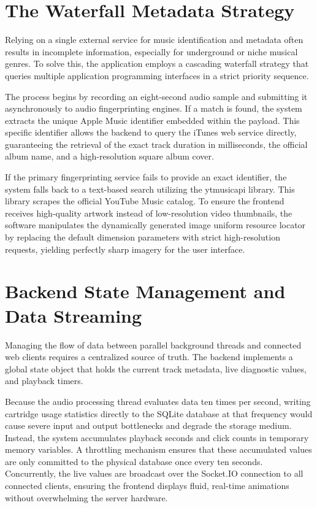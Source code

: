 \documentclass[12pt,a4paper,english]{report}
\begin{document}
\section{The Waterfall Metadata Strategy}

Relying on a single external service for music identification and metadata often results in incomplete information, especially for underground or niche musical genres. To solve this, the application employs a cascading waterfall strategy that queries multiple application programming interfaces in a strict priority sequence.

The process begins by recording an eight-second audio sample and submitting it asynchronously to audio fingerprinting engines. If a match is found, the system extracts the unique Apple Music identifier embedded within the payload. This specific identifier allows the backend to query the iTunes web service directly, guaranteeing the retrieval of the exact track duration in milliseconds, the official album name, and a high-resolution square album cover.

If the primary fingerprinting service fails to provide an exact identifier, the system falls back to a text-based search utilizing the ytmusicapi library. This library scrapes the official YouTube Music catalog. To ensure the frontend receives high-quality artwork instead of low-resolution video thumbnails, the software manipulates the dynamically generated image uniform resource locator by replacing the default dimension parameters with strict high-resolution requests, yielding perfectly sharp imagery for the user interface.

\section{Backend State Management and Data Streaming}

Managing the flow of data between parallel background threads and connected web clients requires a centralized source of truth. The backend implements a global state object that holds the current track metadata, live diagnostic values, and playback timers. 

Because the audio processing thread evaluates data ten times per second, writing cartridge usage statistics directly to the SQLite database at that frequency would cause severe input and output bottlenecks and degrade the storage medium. Instead, the system accumulates playback seconds and click counts in temporary memory variables. A throttling mechanism ensures that these accumulated values are only committed to the physical database once every ten seconds. Concurrently, the live values are broadcast over the Socket.IO connection to all connected clients, ensuring the frontend displays fluid, real-time animations without overwhelming the server hardware.
\end{document}
